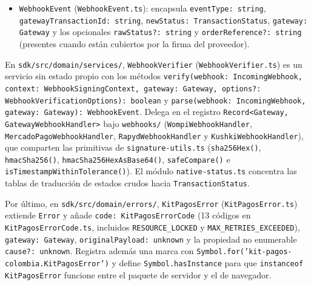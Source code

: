 \begin{itemize}
  \item \texttt{WebhookEvent} (\texttt{WebhookEvent.ts}): encapsula \texttt{eventType: string}, \texttt{gateway\allowbreak{}Transaction\allowbreak{}Id: string}, \texttt{newStatus: Transaction\allowbreak{}Status}, \texttt{gateway: Gateway} y los opcionales \texttt{rawStatus?: string} y \texttt{orderReference?: string} (presentes cuando están cubiertos por la firma del proveedor).
\end{itemize}

En \texttt{sdk/\allowbreak{}src/\allowbreak{}domain/\allowbreak{}services/}, \texttt{Webhook\allowbreak{}Verifier} (\texttt{Webhook\allowbreak{}Verifier.ts}) es un servicio sin estado propio con los métodos \texttt{verify(\allowbreak{}webhook: Incoming\allowbreak{}Webhook, context: Webhook\allowbreak{}Signing\allowbreak{}Context, gateway: Gateway, options?: Webhook\allowbreak{}Verification\allowbreak{}Options): boolean} y \texttt{parse(\allowbreak{}webhook: Incoming\allowbreak{}Webhook, gateway: Gateway): WebhookEvent}. Delega en el registro \texttt{Record<\allowbreak{}Gateway, Gateway\allowbreak{}Webhook\allowbreak{}Handler>} bajo \texttt{webhooks/} (\texttt{Wompi\allowbreak{}Webhook\allowbreak{}Handler}, \texttt{Mercado\allowbreak{}Pago\allowbreak{}Webhook\allowbreak{}Handler}, \texttt{Rapyd\allowbreak{}Webhook\allowbreak{}Handler} y \texttt{Kushki\allowbreak{}Webhook\allowbreak{}Handler}), que comparten las primitivas de \texttt{signature-\allowbreak{}utils.ts} (\texttt{sha256Hex()}, \texttt{hmacSha256()}, \texttt{hmacSha256HexAsBase64()}, \texttt{safeCompare()} e \texttt{is\allowbreak{}Timestamp\allowbreak{}Within\allowbreak{}Tolerance()}). El módulo \texttt{native-\allowbreak{}status.ts} concentra las tablas de traducción de estados crudos hacia \texttt{Transaction\allowbreak{}Status}.

Por último, en \texttt{sdk/src/domain/errors/}, \texttt{KitPagosError} (\texttt{KitPagosError.ts}) extiende \texttt{Error} y añade \texttt{code: KitPagosErrorCode} (13 códigos en \texttt{KitPagosErrorCode.ts}, incluidos \texttt{RESOURCE\_LOCKED} y \texttt{MAX\_RETRIES\_EXCEEDED}), \texttt{gateway: Gateway}, \texttt{originalPayload: unknown} y la propiedad no enumerable \texttt{cause?: unknown}. Registra además una marca con \texttt{Symbol.for('kit-pagos-colombia.KitPagosError')} y define \texttt{Symbol.hasInstance} para que \texttt{instanceof KitPagosError} funcione entre el paquete de servidor y el de navegador.

